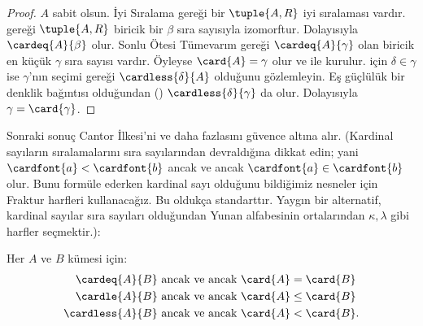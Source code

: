 \begin{proof}
$A$ sabit olsun. İyi Sıralama gereği bir $\tuple{A,R}$ iyi sıralaması
vardır.  gereği
$\tuple{A,R}$ biricik bir $\beta$ sıra sayısıyla izomorftur. Dolayısıyla
$\cardeq{A}{\beta}$ olur. Sonlu Ötesi Tümevarım gereği
$\cardeq{A}{\gamma}$ olan biricik en küçük $\gamma$ sıra sayısı vardır.
Öyleyse $\card{A}=\gamma$ olur ve  ile
 kurulur.  için $\delta\in\gamma$ ise
$\gamma$'nın seçimi gereği $\cardless{\delta}{A}$ olduğunu gözlemleyin.
Eş güçlülük bir denklik bağıntısı olduğundan
()
$\cardless{\delta}{\gamma}$ da olur. Dolayısıyla
$\gamma=\card{\gamma}$.
\end{proof}

Sonraki sonuç Cantor İlkesi'ni ve daha fazlasını güvence altına alır.
(Kardinal sayıların sıralamalarını sıra sayılarından devraldığına dikkat
edin; yani $\cardfont{a}<\cardfont{b}$ ancak ve ancak
$\cardfont{a}\in\cardfont{b}$ olur. Bunu formüle ederken kardinal sayı
olduğunu bildiğimiz nesneler için Fraktur harfleri kullanacağız. Bu oldukça
standarttır. Yaygın bir alternatif, kardinal sayılar sıra sayıları olduğundan
Yunan alfabesinin ortalarından $\kappa,\lambda$ gibi harfler seçmektir.):
\begin{lem}
Her $A$ ve $B$ kümesi için:
\begin{align*}
	\cardeq{A}{B} &\text{ ancak ve ancak } \card{A} = \card{B}\\
	\cardle{A}{B} &\text{ ancak ve ancak } \card{A} \leq \card{B}\\
	\cardless{A}{B}&\text{ ancak ve ancak } \card{A} < \card{B}.
\end{align*}
\end{lem}

